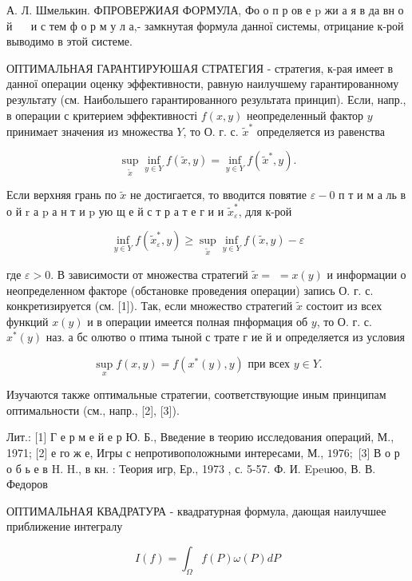 \documentclass[10pt]{article}
\begin{document}
А. Л. Шмелькин. ФПРОВЕРЖИАЯ ФОРМУЛА, Фо о п р ов е $\mathrm{p}$ жи а я в да вн о й $\quad$ и с тем ф о р м у л а,- замкнутая формула данної системы, отрицание к-рой выводимо в этой системе.

ОПТИМАЛЬНАЯ ГАРАНТИРУЮШАЯ СТРАТЕГИЯ - стратегия, к-рая имеет в данної операции оценку эффективности, равную наилучшему гарантированному результату (см. Наибольшего гарантированного результата принцип). Если, напр., в операции с критерием эффективності $f(x, y)$ неопределенный фактор $y$ принимает значения из множества $Y$, то О. г. с. $\tilde{x}^{*}$ определяется из равенства

\[
\sup _{\tilde{x}} \inf _{y \in Y} f(\tilde{x}, y)=\inf _{y \in Y} f\left(\tilde{x}^{*}, y\right) .
\]

Если верхняя грань по $\tilde{x}$ не достигается, то вводится повятие $\varepsilon-0$ п т и м а ль в о й $\mathrm{r}$ а $\mathrm{p}$ а н т и $\mathrm{p}$ ую щ е й с т р а т е г и и $\tilde{x}_{\varepsilon}^{*}$, для к-рой

\[
\inf _{y \in Y} f\left(\tilde{x}_{\varepsilon}^{*}, y\right) \geqslant \sup _{\tilde{x}} \inf _{y \in Y} f(\tilde{x}, y)-\varepsilon
\]

где $\varepsilon>0$. В зависимости от множества стратегий $\tilde{x}=$ $=x(y)$ и информации о неопределенном факторе (обстановке проведения операции) запись О. г. с. конкретизируется (см. [1]). Так, если множество стратегий $\tilde{x}$ состоит из всех функций $x(y)$ и в операции имеется полная пнформация об $y$, то О. г. с. $x^{*}(y)$ наз. а бс олютво о птима тыной с трате г ие й и определяется из условия

\[
\sup _{x} f(x, y)=f\left(x^{*}(y), y\right) \text { при всех } y \in Y .
\]

Изучаются также оптимальные стратегии, соответствующие иным принципам оптимальности (см., напр., [2], [3]).

Лит.: [1] Г е р м е й е р Ю. Б., Введение в теорию исследования операций, М., 1971; [2] е го ж е, Игры с непротивоположными интересами, М., $1976 ;$ [3] В о р о б ь е в H. H., в кн. : Теория игр, Ер., 1973 , с. 5-57. Ф. И. Epeuюо, В. В. Федоров

ОПТИМАЛЬНАЯ КВАДРАТУРА - квадратурная формула, дающая наилучшее приближение интегралу

\[
I(f)=\int_{\Omega} f(P) \omega(P) d P
\]
\end{document}
